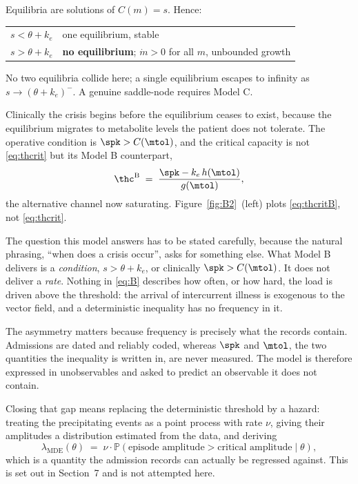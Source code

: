 Equilibria are solutions of $C(m) = s$. Hence:

\begin{center}
\begin{tabular}{@{}ll@{}}
\toprule
$s < \theta + k_e$ & one equilibrium, stable \\
$s > \theta + k_e$ & \textbf{no equilibrium}; $\dot m > 0$ for all $m$, unbounded growth \\
\bottomrule
\end{tabular}
\end{center}

\begin{remark}[Terminology]
No two equilibria collide here; a single equilibrium
escapes to infinity as $s \to (\theta + k_e)^-$. A genuine saddle-node requires Model C.
\end{remark}

\begin{remark}
Clinically the crisis begins before the equilibrium ceases to exist, because the
equilibrium migrates to metabolite levels the patient does not tolerate. The operative
condition is $\spk > C(\mtol)$, and the critical capacity is not
\eqref{eq:thcrit} but its Model B counterpart,
\begin{equation}
\thc^{\mathrm{B}} \;=\; \frac{\spk - k_e\, h(\mtol)}{g(\mtol)},
\label{eq:thcritB}
\end{equation}
the alternative channel now saturating. Figure~\ref{fig:B2}~(left) plots
\eqref{eq:thcritB}, not \eqref{eq:thcrit}.
\end{remark}

\begin{remark}
\label{rem:condition_not_frequency}
The question this model answers has to be stated carefully, because the natural phrasing,
``when does a crisis occur'', asks for something else. What Model B delivers is a
\emph{condition}, $s > \theta + k_e$, or clinically $\spk > C(\mtol)$. It does not deliver
a \emph{rate}. Nothing in \eqref{eq:B} describes how often, or how hard, the load is
driven above the threshold: the arrival of intercurrent illness is exogenous to the vector
field, and a deterministic inequality has no frequency in it.

The asymmetry matters because frequency is precisely what the records contain. Admissions
are dated and reliably coded, whereas $\spk$ and $\mtol$, the two quantities the
inequality is written in, are never measured. The model is therefore expressed in
unobservables and asked to predict an observable it does not contain.

Closing that gap means replacing the deterministic threshold by a hazard: treating the
precipitating events as a point process with rate $\nu$, giving their amplitudes a
distribution estimated from the data, and deriving
\[
\lambda_{\mathrm{MDE}}(\theta) \;=\; \nu \cdot
\mathbb{P}\!\left(\text{episode amplitude} > \text{critical amplitude} \mid \theta\right),
\]
which is a quantity the admission records can actually be regressed against. This is set
out in Section~7 and is not attempted here.
\end{remark}

